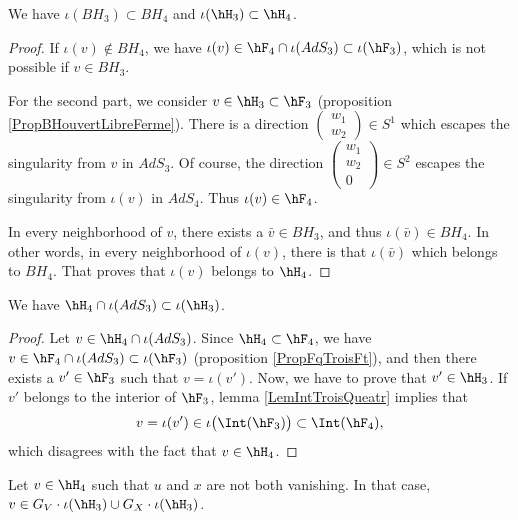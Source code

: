 \begin{corollary}		\label{CorBHBHHHHH}
	We have $\iota(BH_3)\subset BH_4$ and $\iota(\hH_3)\subset \hH_4$.
\end{corollary}

\begin{proof}
	If $\iota(v)\notin BH_4$, we have $\iota(v)\in \hF_4\cap\iota(AdS_3)\subset\iota(\hF_3)$, which is not possible if $v\in BH_3$.

	For the second part, we consider $v\in\hH_3\subset\hF_3$ (proposition \ref{PropBHouvertLibreFerme}). There is a direction $\begin{pmatrix}
		w_1	\\ 
		w_2	
	\end{pmatrix}\in S^1$ which escapes the singularity from $v$ in $AdS_3$. Of course, the direction $\begin{pmatrix}
		w_1	\\ 
		w_2	\\ 
		0
	\end{pmatrix}\in S^2$ escapes the singularity from $\iota(v)$ in $AdS_4$. Thus $\iota(v)\in\hF_4$.

	In every neighborhood of $v$, there exists a $\bar v\in BH_3$, and thus $\iota(\bar v)\in BH_4$. In other words, in every neighborhood of $\iota(v)$, there is that $\iota(\bar v)$ which belongs to $BH_4$. That proves that $\iota(v)$ belongs to $\hH_4$.
\end{proof}

\begin{lemma}		\label{LemHinteridansH}
	We have $\hH_4\cap\iota(AdS_3)\subset\iota(\hH_3)$.
\end{lemma}

\begin{proof}
	Let $v\in\hH_4\cap\iota(AdS_3)$. Since $\hH_4\subset\hF_4$, we have $v\in\hF_4\cap\iota(AdS_3)\subset\iota(\hF_3)$ (proposition \ref{PropFqTroisFt}), and then there exists a $v'\in\hF_3$ such that $v=\iota(v')$. Now, we have to prove that $v'\in\hH_3$. If $v'$ belongs to the interior of $\hF_3$, lemma \ref{LemIntTroisQueatr} implies that
	\begin{equation}
		v=\iota(v')\in\iota\big( \Int(\hF_3) \big)\subset\Int(\hF_4),
	\end{equation}
	which disagrees with the fact that $v\in\hH_4$.
\end{proof}

\begin{lemma}		\label{LemPresqueHOrQadp}
Let $v\in\hH_4$ such that $u$ and $x$ are not both vanishing. In that case, $v\in G_V\cdot \iota(\hH_3)\cup G_X\cdot\iota(\hH_3)$.
\end{lemma}


